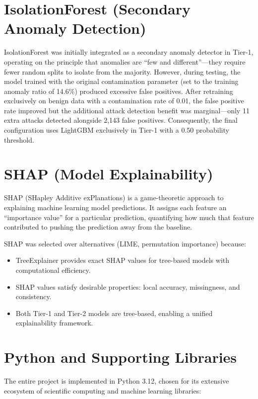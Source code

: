 \documentclass[12pt,a4paper,twoside]{report}
\begin{document}
\section{IsolationForest (Secondary Anomaly Detection)}

IsolationForest was initially integrated as a secondary anomaly detector in Tier-1, operating on the principle that anomalies are ``few and different''—they require fewer random splits to isolate from the majority. However, during testing, the model trained with the original contamination parameter (set to the training anomaly ratio of 14.6\%) produced excessive false positives. After retraining exclusively on benign data with a contamination rate of 0.01, the false positive rate improved but the additional attack detection benefit was marginal—only 11 extra attacks detected alongside 2,143 false positives. Consequently, the final configuration uses LightGBM exclusively in Tier-1 with a 0.50 probability threshold.

\section{SHAP (Model Explainability)}

SHAP (SHapley Additive exPlanations) is a game-theoretic approach to explaining machine learning model predictions. It assigns each feature an ``importance value'' for a particular prediction, quantifying how much that feature contributed to pushing the prediction away from the baseline.

SHAP was selected over alternatives (LIME, permutation importance) because:

\begin{itemize}
    \item TreeExplainer provides exact SHAP values for tree-based models with computational efficiency.
    \item SHAP values satisfy desirable properties: local accuracy, missingness, and consistency.
    \item Both Tier-1 and Tier-2 models are tree-based, enabling a unified explainability framework.
\end{itemize}

\section{Python and Supporting Libraries}

The entire project is implemented in Python 3.12, chosen for its extensive ecosystem of scientific computing and machine learning libraries:
\end{document}
